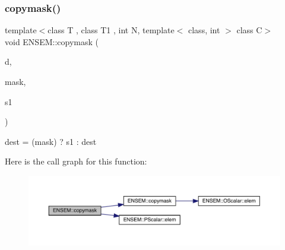 \subsubsection{\texorpdfstring{copymask()}{copymask()}}
{\footnotesize\ttfamily template$<$class T , class T1 , int N, template$<$ class, int $>$ class C$>$ \\
void E\+N\+S\+E\+M\+::copymask (\begin{DoxyParamCaption}\item[{\mbox{\hyperlink{classENSEM_1_1PMatrix}{P\+Matrix}}$<$ T, \mbox{\hyperlink{adat__devel_2lib_2hadron_2operator__name__util_8cc_a7722c8ecbb62d99aee7ce68b1752f337}{N}}, C $>$ \&}]{d,  }\item[{const \mbox{\hyperlink{classENSEM_1_1PScalar}{P\+Scalar}}$<$ T1 $>$ \&}]{mask,  }\item[{const \mbox{\hyperlink{classENSEM_1_1PMatrix}{P\+Matrix}}$<$ T, \mbox{\hyperlink{adat__devel_2lib_2hadron_2operator__name__util_8cc_a7722c8ecbb62d99aee7ce68b1752f337}{N}}, C $>$ \&}]{s1 }\end{DoxyParamCaption})\hspace{0.3cm}{\ttfamily [inline]}}



dest = (mask) ? s1 \+: dest 

Here is the call graph for this function\+:\nopagebreak
\begin{figure}[H]
\begin{center}
\leavevmode
\includegraphics[width=350pt]{df/d0a/group__primmatrix_ga6bebd0377eb8253b3d4ba1586d1ecdad_cgraph}
\end{center}
\end{figure}
\mbox{\label{group__primmatrix_gaad23aac5e121c759d15b6153996bdf9e}} 
